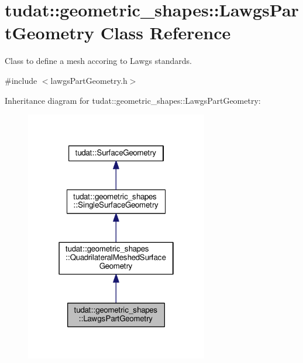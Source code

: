 \hypertarget{classtudat_1_1geometric__shapes_1_1LawgsPartGeometry}{}\section{tudat\+:\+:geometric\+\_\+shapes\+:\+:Lawgs\+Part\+Geometry Class Reference}
\label{classtudat_1_1geometric__shapes_1_1LawgsPartGeometry}


Class to define a mesh accoring to Lawgs standards.  




{\ttfamily \#include $<$lawgs\+Part\+Geometry.\+h$>$}



Inheritance diagram for tudat\+:\+:geometric\+\_\+shapes\+:\+:Lawgs\+Part\+Geometry\+:
\nopagebreak
\begin{figure}[H]
\begin{center}
\leavevmode
\includegraphics[width=226pt]{classtudat_1_1geometric__shapes_1_1LawgsPartGeometry__inherit__graph}
\end{center}
\end{figure}


